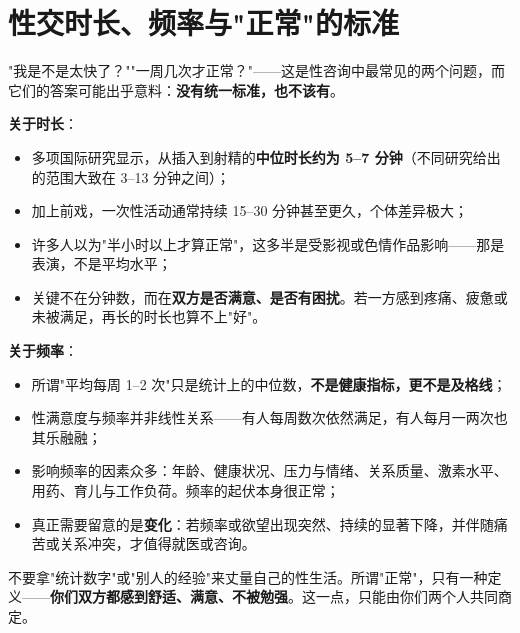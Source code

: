 \section{性交时长、频率与"正常"的标准}

"我是不是太快了？""一周几次才正常？"——这是性咨询中最常见的两个问题，而它们的答案可能出乎意料：\textbf{没有统一标准，也不该有}。

\noindent\textbf{关于时长}：
\begin{itemize}
	\item 多项国际研究显示，从插入到射精的\textbf{中位时长约为 5--7 分钟}（不同研究给出的范围大致在 3--13 分钟之间）；
	\item 加上前戏，一次性活动通常持续 15--30 分钟甚至更久，个体差异极大；
	\item 许多人以为"半小时以上才算正常"，这多半是受影视或色情作品影响——那是表演，不是平均水平；
	\item 关键不在分钟数，而在\textbf{双方是否满意、是否有困扰}。若一方感到疼痛、疲惫或未被满足，再长的时长也算不上"好"。
\end{itemize}

\noindent\textbf{关于频率}：
\begin{itemize}
	\item 所谓"平均每周 1--2 次"只是统计上的中位数，\textbf{不是健康指标，更不是及格线}；
	\item 性满意度与频率并非线性关系——有人每周数次依然满足，有人每月一两次也其乐融融；
	\item 影响频率的因素众多：年龄、健康状况、压力与情绪、关系质量、激素水平、用药、育儿与工作负荷。频率的起伏本身很正常；
	\item 真正需要留意的是\textbf{变化}：若频率或欲望出现突然、持续的显著下降，并伴随痛苦或关系冲突，才值得就医或咨询。
\end{itemize}

\begin{tcolorbox}[colback=pink!5!white,colframe=red!50!black,title=贴心小叮咛]
不要拿"统计数字"或"别人的经验"来丈量自己的性生活。所谓"正常"，只有一种定义——\textbf{你们双方都感到舒适、满意、不被勉强}。这一点，只能由你们两个人共同商定。
\end{tcolorbox}
